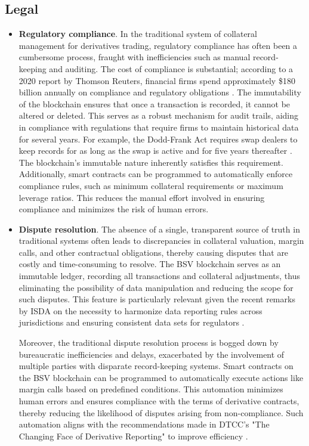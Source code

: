 \subsection{Legal}
\label{subsec:benefits_legal}

\begin{itemize}
    \item \textbf{Regulatory compliance}. In the traditional system of collateral management for derivatives trading, regulatory compliance has often been a cumbersome process, fraught with inefficiencies such as manual record-keeping and auditing. The cost of compliance is substantial; according to a 2020 report by Thomson Reuters, financial firms spend approximately \$180 billion annually on compliance and regulatory obligations \citep{Thomson_Reuters}. The immutability of the blockchain ensures that once a transaction is recorded, it cannot be altered or deleted. This serves as a robust mechanism for audit trails, aiding in compliance with regulations that require firms to maintain historical data for several years. For example, the Dodd-Frank Act \citep{dodd-frank} requires swap dealers to keep records for as long as the swap is active and for five years thereafter \citep{SEC}. The blockchain's immutable nature inherently satisfies this requirement. Additionally, smart contracts can be programmed to automatically enforce compliance rules, such as minimum collateral requirements or maximum leverage ratios. This reduces the manual effort involved in ensuring compliance and minimizes the risk of human errors.

    \item \textbf{Dispute resolution}. The absence of a single, transparent source of truth in traditional systems often leads to discrepancies in collateral valuation, margin calls, and other contractual obligations, thereby causing disputes that are costly and time-consuming to resolve. The BSV blockchain serves as an immutable ledger, recording all transactions and collateral adjustments, thus eliminating the possibility of data manipulation and reducing the scope for such disputes. This feature is particularly relevant given the recent remarks by ISDA on the necessity to harmonize data reporting rules across jurisdictions and ensuring consistent data sets for regulators \citep{isda_transparency}.
    

    Moreover, the traditional dispute resolution process is bogged down by bureaucratic inefficiencies and delays, exacerbated by the involvement of multiple parties with disparate record-keeping systems. Smart contracts on the BSV blockchain can be programmed to automatically execute actions like margin calls based on predefined conditions. This automation minimizes human errors and ensures compliance with the terms of derivative contracts, thereby reducing the likelihood of disputes arising from non-compliance. Such automation aligns with the recommendations made in DTCC's "The Changing Face of Derivative Reporting" to improve efficiency \citep{dtcc_reporting}.
\end{itemize}